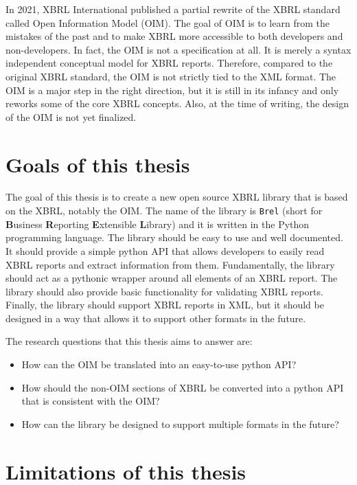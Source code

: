 In 2021, XBRL International published a partial rewrite of the XBRL standard called Open Information Model (OIM)\cite{oim}.
The goal of OIM is to learn from the mistakes of the past and to make XBRL more accessible to both developers and non-developers.
In fact, the OIM is not a specification at all.
It is merely a syntax independent conceptual model for XBRL reports.
Therefore, compared to the original XBRL standard, the OIM is not strictly tied to the XML format.
The OIM is a major step in the right direction, but it is still in its infancy and only reworks some of the core XBRL concepts.
Also, at the time of writing, the design of the OIM is not yet finalized.

\section{Goals of this thesis}

The goal of this thesis is to create a new open source XBRL library that is based on the XBRL, notably the OIM.
The name of the library is \texttt{Brel} (short for \textbf{B}usiness \textbf{R}eporting \textbf{E}xtensible \textbf{L}ibrary) and it is written in the Python programming language.
The library should be easy to use and well documented.
It should provide a simple python API that allows developers to easily read XBRL reports and extract information from them.
Fundamentally, the library should act as a pythonic wrapper around all elements of an XBRL report.
The library should also provide basic functionality for validating XBRL reports.
Finally, the library should support XBRL reports in XML, but it should be designed in a way that allows it to support other formats in the future.

The research questions that this thesis aims to answer are:

\begin{itemize}
    \item How can the OIM be translated into an easy-to-use python API?\label{itm:research_question_1}
    \item How should the non-OIM sections of XBRL be converted into a python API that is consistent with the OIM?\label{itm:research_question_2}
    \item How can the library be designed to support multiple formats in the future?\label{itm:research_question_3}
\end{itemize}

\section{Limitations of this thesis}

